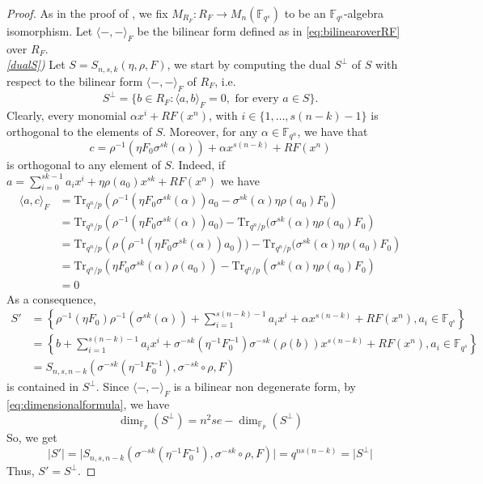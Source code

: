 \documentclass[a4paper, 11pt]{article}
\newcommand{\F}{{\mathbb F}}
\newcommand{\Tr}{{\mathrm{Tr}}}
\begin{document}
\begin{proof}
As in the proof of , we fix $M_{R_F}:R_F \rightarrow M_n(\F_{q^s})$ to be an $\F_{q^s}$-algebra isomorphism. Let $\langle -, - \rangle_F$ be the bilinear form defined as in \eqref{eq:bilinearoverRF} over $R_F$. \\
\emph{\ref{dualS})}  Let $S=S_{n,s,k}(\eta,\rho,F)$, we start by computing the dual $S^{\perp}$ of $S$ with respect to the bilinear form $\langle -,- \rangle_F$ of $R_F$, i.e. 
\[
S^{\perp}=\{b \in R_F \colon \langle a,b \rangle_F=0, \mbox{ for every }a \in S\}.
\]
Clearly, every monomial $\alpha x^i+RF(x^n)$, with $i \in \{1,\ldots,s(n-k)-1\}$ is orthogonal to the elements of $S$. Moreover, for any $\alpha \in \F_{q^n}$, we have that \[c = \rho^{-1}(\eta F_0\sigma^{sk}(\alpha))+\alpha x^{s(n-k)}+RF(x^n)\] is orthogonal to any element of $S$. Indeed, if $a=\sum_{i=0}^{sk-1}a_ix^i+\eta \rho(a_0)x^{sk} + RF(x^n)$ we have 
\[
\begin{split}
\langle a, c \rangle_F &= \Tr_{q^n/p}\left( \rho^{-1}(\eta F_0\sigma^{sk}(\alpha))a_0-\sigma^{sk}(\alpha) \eta \rho(a_0)F_0  \right) \\
&= \Tr_{q^n/p}\left( \rho^{-1}(\eta F_0\sigma^{sk}(\alpha))a_0)-\Tr_{q^n/p}(\sigma^{sk}(\alpha) \eta \rho(a_0)F_0  \right) \\ 
&= \Tr_{q^n/p}\left(\rho( \rho^{-1}(\eta F_0\sigma^{sk}(\alpha))a_0))-\Tr_{q^n/p}(\sigma^{sk}(\alpha) \eta \rho(a_0)F_0  \right)  \\
&= \Tr_{q^n/p}\left( \eta F_0\sigma^{sk}(\alpha)\rho(a_0)\right) - \Tr_{q^n/p}\left(\sigma^{sk}(\alpha)  \eta \rho(a_0)  F_0 \right) \\
&= 0
\end{split}
\]
As a consequence, \[
\begin{split}
S' &= \left\{\rho^{-1}(\eta F_0)\rho^{-1}(\sigma^{sk}(\alpha))+\sum\limits_{i=1}^{s(n-k)-1}a_ix^i+\alpha x^{s(n-k)}+RF(x^n), a_i \in \F_{q^s}\right\}\\
&= \left\{b+\sum\limits_{i=1}^{s(n-k)-1}a_ix^i+\sigma^{-sk}(\eta^{-1}F_0^{-1}) \sigma^{-sk}(\rho(b)) x^{s(n-k)}+RF(x^n), a_i \in \F_{q^s}\right\} \\
&= S_{n,s,n-k}(\sigma^{-sk}(\eta^{-1}F_0^{-1}), \sigma^{-sk} \circ \rho,F)
\end{split}
\]
is contained in $S^{\perp}$. Since $\langle -,- \rangle_F$ is a bilinear non degenerate  form, by \eqref{eq:dimensionalformula}, we have  \[
\dim_{\F_p}(S^{\perp})=n^2se-\dim_{\F_p}(S^{\perp})
\]
So, we get
\[
\lvert S' \rvert= \lvert S_{n,s,n-k}(\sigma^{-sk}(\eta^{-1}F_0^{-1}), \sigma^{-sk} \circ \rho,F) \rvert=q^{ns(n-k)}=\lvert S^{\perp} \rvert
\]
Thus, $S'=S^{\perp}$.


\end{proof}
\end{document}
